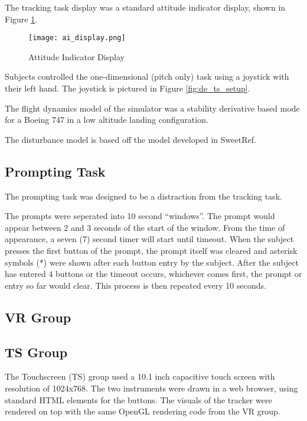 The tracking task display was a standard attitude indicator display, shown in Figure \ref{fig:de_ai_display}.

\begin{figure}
    \texttt{[image: ai\_display.png]}
    \caption{Attitude Indicator Display}
    \label{fig:de_ai_display}
\end{figure}

Subjects controlled the one-dimensional (pitch only) task using a joystick with their left hand.
The joystick is pictured in Figure \ref{fig:de_ts_setup}.

The flight dynamics model of the simulator was a stability derivative based mode for a Boeing 747 in a low altitude landing configuration.

The disturbance model is based off the model developed in SweetRef.


\subsection{Prompting Task}

The prompting task was designed to be a distraction from the tracking task.

The prompts were seperated into 10 second ``windows''.
The prompt would appear between 2 and 3 seconds of the start of the window.
From the time of appearance, a seven (7) second timer will start until timeout.
When the subject presses the first button of the prompt, the prompt itself was cleared and asterisk symbols (*) were shown after each button entry by the subject.
After the subject has entered 4 buttons or the timeout occurs, whichever comes first, the prompt or entry so far would clear.
This process is then repeated every 10 seconds.

\subsection{VR Group}

\subsection{TS Group}

The Touchscreen (TS) group used a 10.1 inch capacitive touch screen with resolution of 1024x768.
The two instruments were drawn in a web browser, using standard HTML elements for the buttons.
The visuals of the tracker were rendered on top with the same OpenGL rendering code from the VR group.


